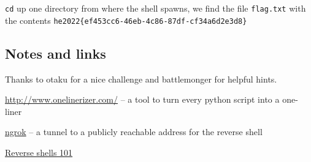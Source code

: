\noindent\verb+cd+ up one directory from where the shell spawns, we find the file \verb+flag.txt+ with the contents \verb+he2022{ef453cc6-46eb-4c86-87df-cf34a6d2e3d8}+

\subsection{Notes and links}

Thanks to otaku for a nice challenge and battlemonger for helpful hints.

\noindent\href{http://www.onelinerizer.com/}{http://www.onelinerizer.com/} -- a tool to turn every python script into a one-liner

\noindent\href{https://ngrok.com/}{ngrok} -- a tunnel to a publicly reachable address for the reverse shell

\noindent\href{https://metahackers.pro/reverse-shells-101/}{Reverse shells 101}

